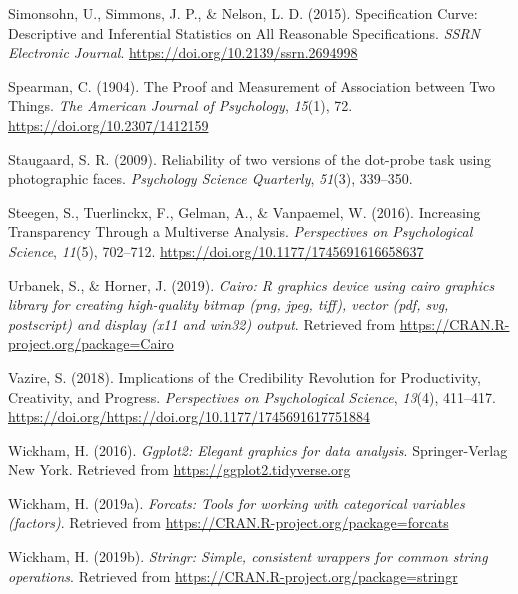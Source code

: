 \documentclass[
  english,
  man,floatsintext]{apa6}
\begin{document}
\leavevmode\hypertarget{ref-simonsohn_specification_2015}{}%
Simonsohn, U., Simmons, J. P., \& Nelson, L. D. (2015). Specification Curve: Descriptive and Inferential Statistics on All Reasonable Specifications. \emph{SSRN Electronic Journal}. \url{https://doi.org/10.2139/ssrn.2694998}

\leavevmode\hypertarget{ref-spearman_proof_1904}{}%
Spearman, C. (1904). The Proof and Measurement of Association between Two Things. \emph{The American Journal of Psychology}, \emph{15}(1), 72. \url{https://doi.org/10.2307/1412159}

\leavevmode\hypertarget{ref-staugaard_reliability_2009}{}%
Staugaard, S. R. (2009). Reliability of two versions of the dot-probe task using photographic faces. \emph{Psychology Science Quarterly}, \emph{51}(3), 339--350.

\leavevmode\hypertarget{ref-steegen_increasing_2016}{}%
Steegen, S., Tuerlinckx, F., Gelman, A., \& Vanpaemel, W. (2016). Increasing Transparency Through a Multiverse Analysis. \emph{Perspectives on Psychological Science}, \emph{11}(5), 702--712. \url{https://doi.org/10.1177/1745691616658637}

\leavevmode\hypertarget{ref-R-Cairo}{}%
Urbanek, S., \& Horner, J. (2019). \emph{Cairo: R graphics device using cairo graphics library for creating high-quality bitmap (png, jpeg, tiff), vector (pdf, svg, postscript) and display (x11 and win32) output}. Retrieved from \url{https://CRAN.R-project.org/package=Cairo}

\leavevmode\hypertarget{ref-vazire_implications_2018}{}%
Vazire, S. (2018). Implications of the Credibility Revolution for Productivity, Creativity, and Progress. \emph{Perspectives on Psychological Science}, \emph{13}(4), 411--417. \url{https://doi.org/https://doi.org/10.1177/1745691617751884}

\leavevmode\hypertarget{ref-R-ggplot2}{}%
Wickham, H. (2016). \emph{Ggplot2: Elegant graphics for data analysis}. Springer-Verlag New York. Retrieved from \url{https://ggplot2.tidyverse.org}

\leavevmode\hypertarget{ref-R-forcats}{}%
Wickham, H. (2019a). \emph{Forcats: Tools for working with categorical variables (factors)}. Retrieved from \url{https://CRAN.R-project.org/package=forcats}

\leavevmode\hypertarget{ref-R-stringr}{}%
Wickham, H. (2019b). \emph{Stringr: Simple, consistent wrappers for common string operations}. Retrieved from \url{https://CRAN.R-project.org/package=stringr}
\end{document}
